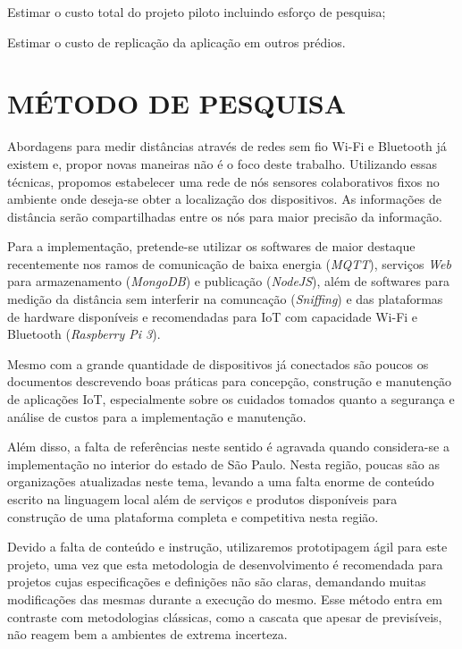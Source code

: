 \documentclass[
	12pt,				%
	openright,			%
	oneside,			%
	a4paper,			%
	chapter=TITLE,		%
	english,			%
	french,				%
	spanish,			%
	brazil				%
	]{abntex2}
\begin{document}
{\begin{alineas}
	\item Estimar o custo total do projeto piloto incluindo esforço de pesquisa;

	\item Estimar o custo de replicação da aplicação em outros prédios.

\end{alineas}

\chapter{MÉTODO DE PESQUISA}
\label{chap:MÉTODO DE PESQUISA}

Abordagens para medir distâncias através de redes sem fio Wi-Fi
\cite{bahillo2009ieee} e Bluetooth já existem e, propor novas maneiras não é o
foco deste trabalho. Utilizando essas técnicas, propomos estabelecer uma rede de
nós sensores colaborativos fixos no ambiente onde deseja-se obter a localização
dos dispositivos. As informações de distância serão compartilhadas entre os nós
para maior precisão da informação.

Para a implementação, pretende-se utilizar os softwares de maior destaque
recentemente nos ramos de comunicação de baixa energia (\textit{MQTT}), serviços
\textit{Web} para armazenamento (\textit{MongoDB}) e publicação
(\textit{NodeJS}), além de softwares para medição da distância sem interferir na
comuncação (\textit{Sniffing}) e das plataformas de hardware disponíveis e
recomendadas para IoT com capacidade Wi-Fi e Bluetooth (\textit{Raspberry Pi
3}).

Mesmo com a grande quantidade de dispositivos já conectados são poucos os
documentos descrevendo boas práticas para concepção, construção e manutenção de
aplicações IoT, especialmente sobre os cuidados tomados quanto a segurança e
análise de custos para a implementação e manutenção.

Além disso, a falta de referências neste sentido é agravada quando considera-se
a implementação no interior do estado de São Paulo. Nesta região, poucas são as
organizações atualizadas neste tema, levando a uma falta enorme de conteúdo
escrito na linguagem local além de serviços e produtos disponíveis para
construção de uma plataforma completa e competitiva nesta região.

Devido a falta de conteúdo e instrução, utilizaremos prototipagem ágil para este
projeto, uma vez que esta metodologia de desenvolvimento é recomendada para
projetos cujas especificações e definições não são claras, demandando muitas
modificações das mesmas durante a execução do mesmo. Esse método entra em
contraste com metodologias clássicas, como a cascata que apesar de previsíveis,
não reagem bem a ambientes de extrema incerteza.

}
\end{document}
